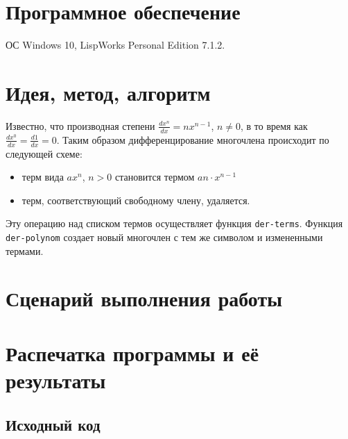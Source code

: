 \documentclass[12pt]{article}
\begin{document}
\section{Программное обеспечение}
ОС Windows 10, LispWorks Personal Edition 7.1.2.

\section{Идея, метод, алгоритм}
Известно, что производная степени $\frac{d x^n}{d x} = n x^{n-1}$, $n \neq 0$, в то время как $\frac{d x^0}{d x} = \frac{d 1}{d x} = 0$. Таким образом дифференцирование многочлена происходит по следующей схеме:

\begin{itemize}
\setlength{\itemsep}{-1mm}
\item терм вида $a x^n$, $n > 0$ становится термом $a n \cdot x^{n-1}$
\item терм, соответствующий свободному члену, удаляется.
\end{itemize}

Эту операцию над списком термов осуществляет функция {\tt der-terms}. Функция {\tt der-polynom} создает новый многочлен с тем же символом и измененными термами.

\section{Сценарий выполнения работы}

\section{Распечатка программы и её результаты}

\subsection{Исходный код}

\end{document}
